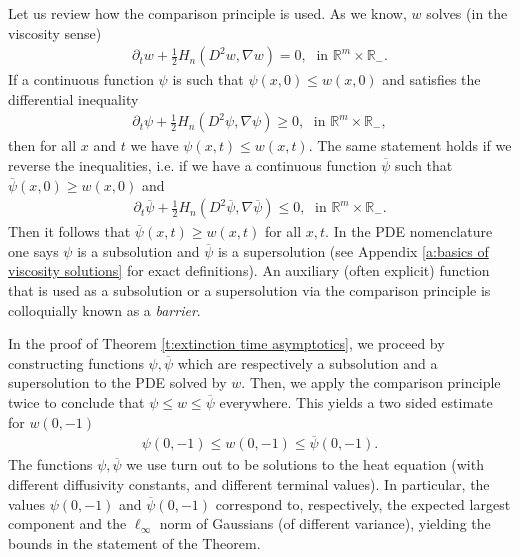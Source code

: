 \documentclass[reqno]{amsart}
\numberwithin{equation}{section}
\begin{document}
Let us review how the comparison principle is used. As we know, $w$ solves (in the viscosity sense)
\begin{align*}
  \partial_t w + \tfrac{1}{2}H_n(D^2w,\nabla w) = 0,\; \text{ in } \mathbb{R}^m\times \mathbb{R}_-.
\end{align*}
If a continuous function $\psi$ is such that $\psi(x,0)\leq w(x,0)$ and satisfies the differential inequality
\begin{align*}
  \partial_t \psi + \tfrac{1}{2}H_n(D^2\psi,\nabla \psi) \geq 0,\; \text{ in } \mathbb{R}^m\times \mathbb{R}_-,
\end{align*}
then for all $x$ and $t$ we have $\psi(x,t)\leq w(x,t)$. The same statement holds if we reverse the inequalities, i.e. if we have a continuous function $\overline \psi$ such that $\overline \psi(x,0) \geq w(x,0)$ and 
\begin{align*}
  \partial_t \overline \psi + \tfrac{1}{2}H_n(D^2\overline \psi,\nabla \overline \psi) \leq 0,\; \text{ in } \mathbb{R}^m\times \mathbb{R}_-.
\end{align*}
Then it follows that $\overline\psi(x,t)\geq w(x,t)$ for all $x,t$. In the PDE nomenclature  one says $\psi$ is a subsolution and $\overline \psi$ is a supersolution (see Appendix \ref{a:basics of viscosity solutions} for exact definitions). An auxiliary (often explicit) function that is used as a subsolution or a supersolution via the comparison principle is colloquially known as a \emph{barrier}.

In the proof of Theorem \ref{t:extinction time asymptotics}, we proceed by constructing functions $\psi,\overline \psi$ which are respectively a subsolution and a supersolution to the PDE solved by $w$. Then, we apply the comparison principle twice to conclude that $\psi\leq w\leq \overline \psi$ everywhere. This yields a two sided estimate for $w(0,-1)$ 
\begin{align*}
  \psi(0,-1) \leq w(0,-1) \leq \overline \psi(0,-1).
\end{align*}
The functions $\psi, \overline \psi$ we use turn out to be solutions to the heat equation (with different diffusivity constants, and different terminal values). In particular, the values $\psi(0,-1)$ and $\overline \psi(0,-1)$ correspond to, respectively, the expected largest component and the $\ell_\infty$ norm of Gaussians (of different variance), yielding the bounds in the statement of the Theorem.
\end{document}

